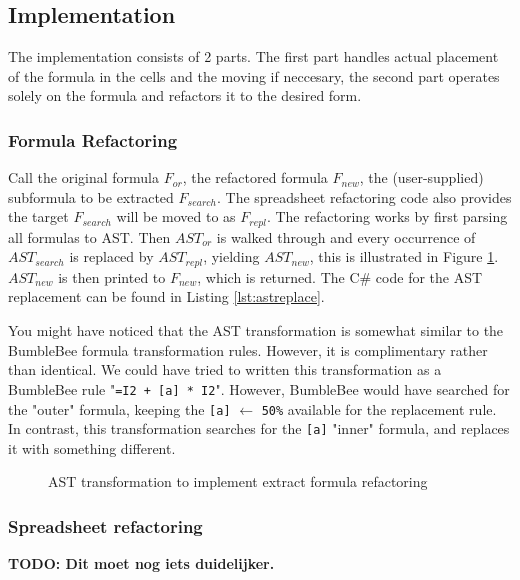 \documentclass[12pt,a4paper,onecolumn,oneside,parskip]{memoir}
\newcommand{\todo}[1]{\textbf{TODO: #1}}
\newcommand{\f}[1]{\texttt{#1}}
\begin{document}
\subsection{Implementation}

The implementation consists of 2 parts.
The first part handles actual placement of the formula in the cells and the moving if neccesary, the second part operates solely on the formula and refactors it to the desired form.

\subsubsection{Formula Refactoring}

Call the original formula $F_{or}$, the refactored formula $F_{new}$, the (user-supplied) subformula to be extracted $F_{search}$.
The spreadsheet refactoring code also provides the target $F_{search}$ will be moved to as $F_{repl}$.
The refactoring works by first parsing all formulas to AST.
Then $AST_{or}$ is walked through and every occurrence of $AST_{search}$ is replaced by $AST_{repl}$, yielding $AST_{new}$, this is illustrated in Figure \ref{fig:extractformulaASTtransformations}.
$AST_{new}$ is then printed to $F_{new}$, which is returned.
The C\# code for the AST replacement can be found in Listing \ref{lst:astreplace}.

You might have noticed that the AST transformation is somewhat similar to the BumbleBee formula transformation rules.
However, it is complimentary rather than identical.
We could have tried to written this transformation as a BumbleBee rule "\f{=I2 + [a] * I2}".
However, BumbleBee would have searched for the "outer" formula, keeping the \f{[a]} $\gets$ \f{50\%} available for the replacement rule.
In contrast, this transformation searches for the \f{[a]} "inner" formula, and replaces it with something different.

\begin{figure}
\centering

\caption{AST transformation to implement extract formula refactoring}
\label{fig:extractformulaASTtransformations}
\end{figure}

\subsubsection{Spreadsheet refactoring}

\todo{Dit moet nog iets duidelijker.}
\end{document}
